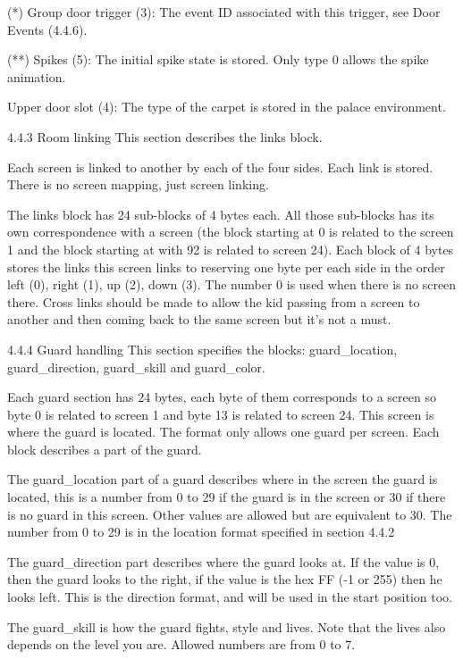  (*) Group door trigger (3):
 The event ID associated with this trigger, see Door Events (4.4.6).

 (**) Spikes (5):
 The initial spike state is stored. Only type 0 allows the spike animation.

 Upper door slot (4):
 The type of the carpet is stored in the palace environment.

4.4.3 Room linking
 This section describes the links block.

 Each screen is linked to another by each of the four sides. Each link
 is stored. There is no screen mapping, just screen linking.

 The links block has 24 sub-blocks of 4 bytes each. All those sub-blocks
 has its own correspondence with a screen (the block starting at 0 is
 related to the screen 1 and the block starting at with 92 is related to
 screen 24).
 Each block of 4 bytes stores the links this screen links to reserving one
 byte per each side in the order left (0), right (1), up (2), down (3).
 The number 0 is used when there is no screen there.
 Cross links should be made to allow the kid passing from a screen to
 another and then coming back to the same screen but it's not a must.

4.4.4 Guard handling
 This section specifies the blocks: guard_location, guard_direction,
 guard_skill and guard_color.

 Each guard section has 24 bytes, each byte of them corresponds to a screen
 so byte 0 is related to screen 1 and byte 13 is related to screen 24.
 This screen is where the guard is located. The format only allows one
 guard per screen. Each block describes a part of the guard.

 The guard_location part of a guard describes where in the screen the guard
 is located, this is a number from 0 to 29 if the guard is in the screen or
 30 if there is no guard in this screen. Other values are allowed but are
 equivalent to 30. The number from 0 to 29 is in the location format
 specified in section 4.4.2
 
 The guard_direction part describes where the guard looks at. If the value
 is 0, then the guard looks to the right, if the value is the hex FF (-1 or
 255) then he looks left. This is the direction format, and will be used in
 the start position too.

 The guard_skill is how the guard fights, style and lives. Note that the
 lives also depends on the level you are. Allowed numbers are from 0 to 7.

